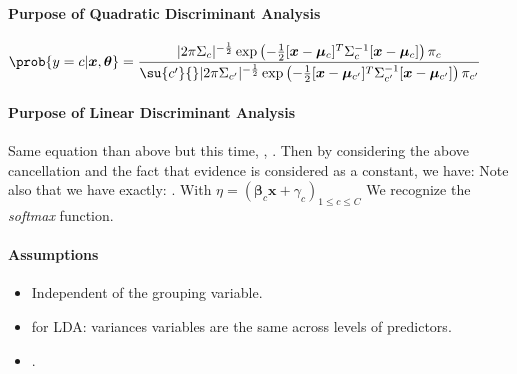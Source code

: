 \paragraph{Purpose of Quadratic Discriminant Analysis}
\begin{center}
    $\prob{y=c|\bm{x},\bm{\theta}} = \dfrac{|2\pi\Sigma_{c}|^{
    -\frac{1}{2}}\exp\left(-\frac{1}{2}[\bm{x}-\bm{\mu}_{c}]^{T}\Sigma_{
    c}^{-1}[\bm{x}-\bm{\mu}_{c}]\right)\pi_{c}}{\su{c'}{}|2\pi\Sigma_{
    c'}|^{-\frac{1}{2}}\exp\left(-\frac{1}{2}[\bm{x}-\bm{\mu}_{c'}]^{T}
    \Sigma_{c'}^{-1}[\bm{x}-\bm{\mu}_{c'}]\right)\pi_{c'}}$
\end{center}

\paragraph{Purpose of Linear Discriminant Analysis}
Same equation than above but this time, , .
Then by considering the above cancellation and the fact that 
evidence is considered as a constant, we have:
Note also that we have exactly: . With $\eta=\left(
\bm{\beta}_{c}\bm{x} +\gamma_{c}\right)_{1\leq c\leq C}$
We recognize the \emph{softmax} function.

\paragraph{Assumptions}
\begin{itemize}
    \item Independent  of the
        grouping variable.
    \item {} for LDA: variances  
        variables are the same across levels of predictors.
    \item {}.
\end{itemize}


